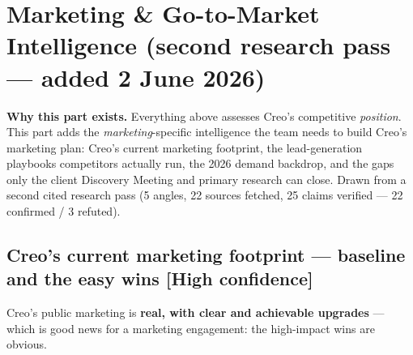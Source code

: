 \documentclass[11pt]{article}
\newcommand{\high}{\textcolor{green!45!black}{\textbf{[High confidence]}}}
\begin{document}
\section{Marketing \& Go-to-Market Intelligence \textnormal{\small(second research pass --- added 2 June 2026)}}

\begin{takeaway}
\textbf{Why this part exists.} Everything above assesses Creo's competitive
\emph{position}. This part adds the \emph{marketing}-specific intelligence the team needs
to build Creo's marketing plan: Creo's current marketing footprint, the lead-generation
playbooks competitors actually run, the 2026 demand backdrop, and the gaps only the client
Discovery Meeting and primary research can close. Drawn from a second cited research pass
(5 angles, 22 sources fetched, 25 claims verified --- 22 confirmed / 3 refuted).
\end{takeaway}

\subsection{Creo's current marketing footprint --- baseline and the easy wins \high}
Creo's public marketing is \textbf{real, with clear and achievable upgrades} --- which is
good news for a marketing engagement: the high-impact wins are obvious.
\end{document}
